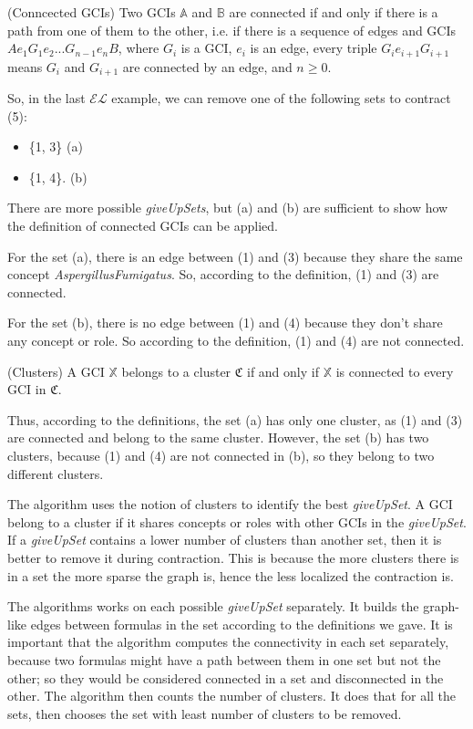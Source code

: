 \begin{defn}(Conncected GCIs)
Two GCIs $\mathbb{A}$ and $\mathbb{B}$ are connected if and only if there is a path from one of them to the other, i.e. if there is a sequence of edges and GCIs $Ae_1G_1e_2 ... G_{n-1}e_nB$, where $G_i$ is a GCI, $e_i$ is an edge, every triple $G_ie_{i+1}G_{i+1}$ means $G_i$ and $G_{i+1}$ are connected by an edge, and $n \geq 0$.
\end{defn}

So, in the last $\mathcal{EL}$ example, we can remove one of the following sets to contract (5):
\begin{itemize}
\item \{1, 3\} (a)
\item \{1, 4\}. (b)
\end{itemize}

There are more possible \textit{giveUpSets}, but (a) and (b) are sufficient to show how the definition of connected GCIs can be applied. 

For the set (a), there is an edge between (1) and (3) because they share the same concept \textit{AspergillusFumigatus}. So, according to the definition, (1) and (3) are connected.

For the set (b), there is no edge between (1) and (4) because they don't share any concept or role. So according to the definition, (1) and (4) are not connected.

\begin{defn}(Clusters)
A GCI $\mathbb{X}$ belongs to a cluster $\mathfrak{C}$ if and only if $\mathbb{X}$ is connected to every GCI in $\mathfrak{C}$.
\end{defn}

Thus, according to the definitions, the set (a) has only one cluster, as (1) and (3) are connected and belong to the same cluster. However, the set (b) has two clusters, because (1) and (4) are not connected in (b), so they belong to two different clusters.

The algorithm uses the notion of clusters to identify the best \textit{giveUpSet}. A GCI belong to a cluster if it shares concepts or roles with other GCIs in the \textit{giveUpSet}. If a \textit{giveUpSet} contains a lower number of clusters than another set, then it is better to remove it during contraction. This is because the more clusters there is in a set the more sparse the graph is, hence the less localized the contraction is. 

The algorithms works on each possible \textit{giveUpSet} separately. It builds the graph-like edges between formulas in the set according to the definitions we gave. It is important that the algorithm computes the connectivity in each set separately, because two formulas might have a path between them in one set but not the other; so they would be considered connected in a set and disconnected in the other. The algorithm then counts the number of clusters. It does that for all the sets, then chooses the set with least number of clusters to be removed.


